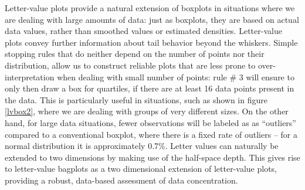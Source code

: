 \documentclass[oneside]{article}
\begin{document}
Letter-value plots provide a natural extension of boxplots in situations where we are dealing with large amounts of data: just as boxplots, they are based on actual data values, rather than smoothed values or estimated densities. Letter-value plots convey further information about tail behavior beyond the whiskers. Simple stopping rules that do neither depend on the number of points nor their distribution, allow us to construct reliable plots that are less prone to over-interpretation when dealing with small number of points: rule \# 3 will ensure to only then draw a box for quartiles, if there are at least 16 data points present in the data. This is particularly useful in situations, such as shown in figure \ref{lvbox2}, where we are dealing with groups of very different sizes. On the other hand, for large data situations, fewer observations will be labeled as  as ``outliers'' 
compared to a conventional boxplot, where there is a fixed rate of outliers -- for a normal distribution it is approximately 0.7\%.
Letter values can naturally be extended to two dimensions by making use of the half-space depth. This gives rise to letter-value bagplots as a two dimensional extension of letter-value plots, providing a robust, data-based assessment of data concentration. 

%
\end{document}

